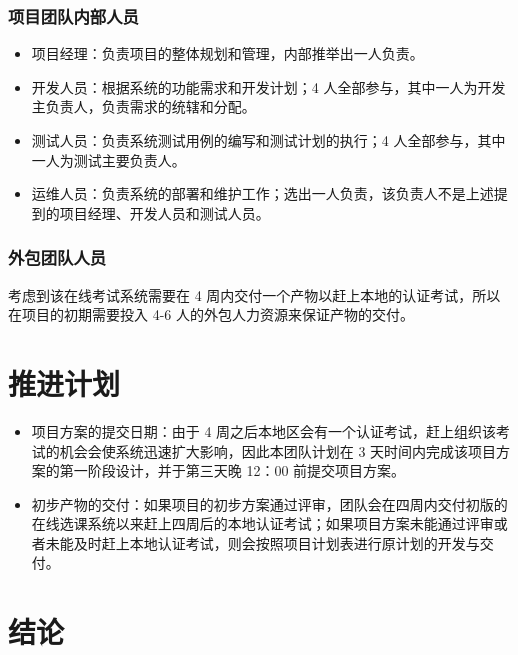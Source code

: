 \documentclass{article}
\begin{document}
\subsubsection{项目团队内部人员}
\begin{itemize}
	\item 项目经理：负责项目的整体规划和管理，内部推举出一人负责。
	\item 开发人员：根据系统的功能需求和开发计划；4 人全部参与，其中一人为开发主负责人，负责需求的统辖和分配。
	\item 测试人员：负责系统测试用例的编写和测试计划的执行；4 人全部参与，其中一人为测试主要负责人。
	\item 运维人员：负责系统的部署和维护工作；选出一人负责，该负责人不是上述提到的项目经理、开发人员和测试人员。
\end{itemize}

\subsubsection{外包团队人员}
考虑到该在线考试系统需要在 4 周内交付一个产物以赶上本地的认证考试，所以在项目的初期需要投入 4-6 人的外包人力资源来保证产物的交付。

\section{推进计划}
\begin{itemize}
	\item 项目方案的提交日期：由于 4 周之后本地区会有一个认证考试，赶上组织该考试的机会会使系统迅速扩大影响，因此本团队计划在 3 天时间内完成该项目方案的第一阶段设计，并于第三天晚 12：00 前提交项目方案。
	\item 初步产物的交付：如果项目的初步方案通过评审，团队会在四周内交付初版的在线选课系统以来赶上四周后的本地认证考试；如果项目方案未能通过评审或者未能及时赶上本地认证考试，则会按照项目计划表进行原计划的开发与交付。
\end{itemize}

\section{结论}
\end{document}
